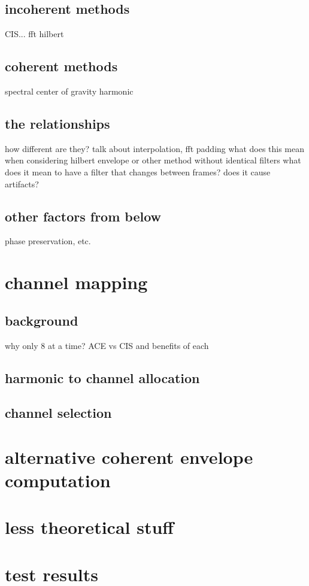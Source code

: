 \documentclass [11pt, proquest] {uwthesis}[2015/03/03]
\begin{document}
	\subsection{incoherent methods}
		CIS...
		fft
		hilbert
	\subsection{coherent methods}
		spectral center of gravity
		harmonic
	\subsection{the relationships}
		how different are they?
		talk about interpolation, fft padding
		what does this mean when considering hilbert envelope
		or other method without identical filters
		what does it mean to have a filter that changes
		between frames?  does it cause artifacts?
	\subsection{other factors from below}
		phase preservation, etc.

\section{channel mapping}
	\subsection{background}
	why only 8 at a time?
	ACE vs CIS and benefits of each
	\subsection{harmonic to channel allocation}
	\subsection{channel selection}

\section{alternative coherent envelope computation}	

\section{less theoretical stuff}	
	
\section{test results}
\end{document}
